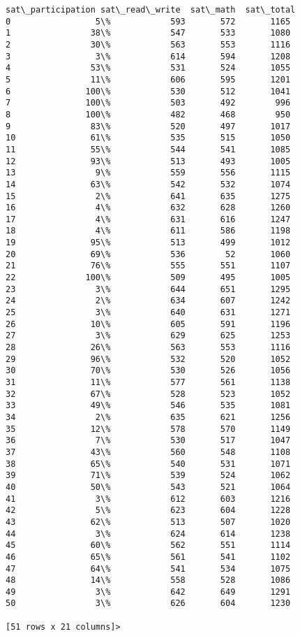 \documentclass[11pt]{article}
\begin{document}
\begin{Verbatim}[commandchars=\\\{\}]
   sat\_participation sat\_read\_write  sat\_math  sat\_total  
0                 5\%            593       572       1165  
1                38\%            547       533       1080  
2                30\%            563       553       1116  
3                 3\%            614       594       1208  
4                53\%            531       524       1055  
5                11\%            606       595       1201  
6               100\%            530       512       1041  
7               100\%            503       492        996  
8               100\%            482       468        950  
9                83\%            520       497       1017  
10               61\%            535       515       1050  
11               55\%            544       541       1085  
12               93\%            513       493       1005  
13                9\%            559       556       1115  
14               63\%            542       532       1074  
15                2\%            641       635       1275  
16                4\%            632       628       1260  
17                4\%            631       616       1247  
18                4\%            611       586       1198  
19               95\%            513       499       1012  
20               69\%            536        52       1060  
21               76\%            555       551       1107  
22              100\%            509       495       1005  
23                3\%            644       651       1295  
24                2\%            634       607       1242  
25                3\%            640       631       1271  
26               10\%            605       591       1196  
27                3\%            629       625       1253  
28               26\%            563       553       1116  
29               96\%            532       520       1052  
30               70\%            530       526       1056  
31               11\%            577       561       1138  
32               67\%            528       523       1052  
33               49\%            546       535       1081  
34                2\%            635       621       1256  
35               12\%            578       570       1149  
36                7\%            530       517       1047  
37               43\%            560       548       1108  
38               65\%            540       531       1071  
39               71\%            539       524       1062  
40               50\%            543       521       1064  
41                3\%            612       603       1216  
42                5\%            623       604       1228  
43               62\%            513       507       1020  
44                3\%            624       614       1238  
45               60\%            562       551       1114  
46               65\%            561       541       1102  
47               64\%            541       534       1075  
48               14\%            558       528       1086  
49                3\%            642       649       1291  
50                3\%            626       604       1230  

[51 rows x 21 columns]>

    \end{Verbatim}
\end{document}
